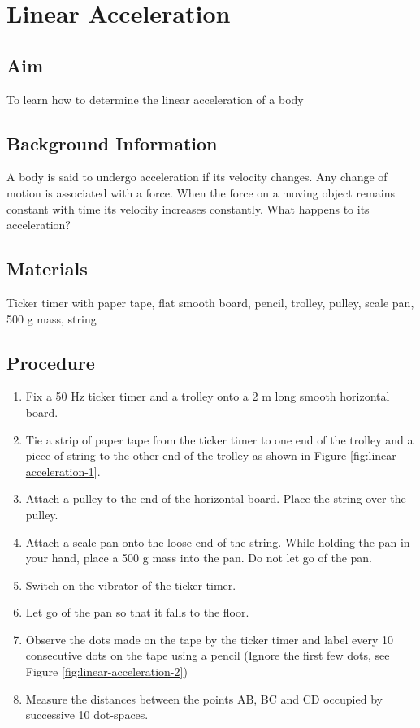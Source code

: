 \chapter{Linear Acceleration}

\section{Aim}
To learn how to determine the linear acceleration of a body

\section{Background Information}
A body is said to undergo acceleration if its velocity changes. Any change of motion is associated with a force. When the force on a moving object remains constant with time its velocity increases constantly. What happens to its acceleration? 

\section{Materials}
Ticker timer with paper tape, flat smooth board, pencil, trolley, pulley, scale pan, 500 g mass, string 

\section{Procedure}
\begin{enumerate}
\item Fix a 50 Hz ticker timer and a trolley onto a 2 m long smooth horizontal board.
\item Tie a strip of paper tape from the ticker timer to one end of the trolley and a piece of string to the other end of the trolley as shown in Figure \ref{fig:linear-acceleration-1}. 
\item Attach a pulley to the end of the horizontal board. Place the string over the pulley.
\item Attach a scale pan onto the loose end of the string. While holding the pan in your hand, place a 500 g mass into the pan. Do not let go of the pan.
\item Switch on the vibrator of the ticker timer.
\item Let go of the pan so that it falls to the floor. 
\item Observe the dots made on the tape by the ticker timer and label every 10 consecutive dots on the tape using a pencil (Ignore the first few dots, see Figure \ref{fig:linear-acceleration-2})
\item Measure the distances between the points AB, BC and CD occupied by successive 10 dot-spaces.
\end{enumerate}

